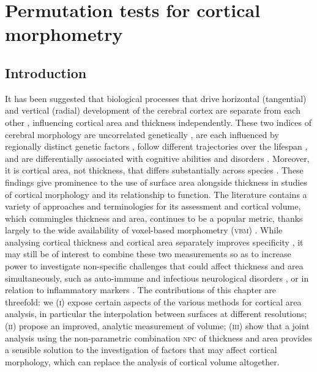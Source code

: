 \chapter{Permutation tests for cortical morphometry}
\label{sec:cortex}
\setstretch{\lspac}

\section{Introduction}
\label{sec:cortex:intro}
\setstretch{\lspac}

It has been suggested that biological processes that drive horizontal (tangential) and vertical (radial) development of the cerebral cortex are separate from each other \citep{Rakic1988,Geschwind2013}, influencing cortical area and thickness independently. These two indices of cerebral morphology are uncorrelated genetically \citep{Panizzon2009, Winkler2010}, are each influenced by regionally distinct genetic factors \citep{Schmitt2008, Rimol2010_bp, Chen2012, Chen2015}, follow different trajectories over the lifespan \citep{OLeary2007, Hogstrom2013, Fjell2015}, and are differentially associated with cognitive abilities and disorders \citep{Schnack2015, Noble2015, Lee2016, Vuoksimaa2016}. Moreover, it is cortical area, not thickness, that differs substantially across species \citep{Rakic1995}. These findings give prominence to the use of surface area alongside thickness in studies of cortical morphology and its relationship to function. The literature contains a variety of approaches and terminologies for its assessment and cortical volume, which commingles thickness and area, continues to be a popular metric, thanks largely to the wide availability of voxel-based morphometry (\textsc{vbm}) \citep{Ashburner2000, Good2001, Douaud2007}. While analysing cortical thickness and cortical area separately improves specificity \citep{Rimol2012}, it may still be of interest to combine these two measurements so as to increase power to investigate non-specific challenges that could affect thickness and area simultaneously, such as auto-immune \citep{Ceccarelli2008, Zhang2016} and infectious neurological disorders \citep{Gitelman2001, Kuper2011}, or in relation to inflammatory markers \citep{Marsland2008, Zhang2015}. The contributions of this chapter are threefold: we (\textsc{i}) expose certain aspects of the various methods for cortical area analysis, in particular the interpolation between surfaces at different resolutions; (\textsc{ii}) propose an improved, analytic measurement of volume; (\textsc{iii}) show that a joint analysis using the non-parametric combination \textsc{npc} \citep{Pesarin2010, Winkler2016_npc} of thickness and area provides a sensible solution to the investigation of factors that may affect cortical morphology, which can replace the analysis of cortical volume altogether.
 
